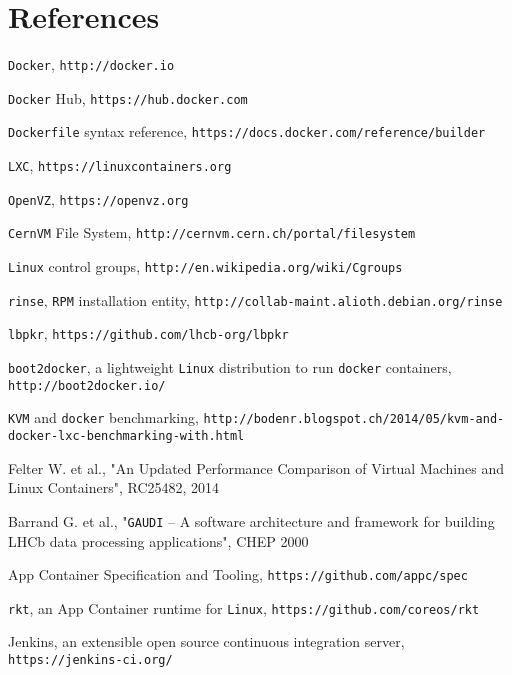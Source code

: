 \documentclass[a4paper]{jpconf}
\begin{document}
\section*{References}
\begin{thebibliography}{9}

	 \texttt{Docker},
		\verb'http://docker.io'

	 \texttt{Docker} Hub,
		\verb'https://hub.docker.com'

	 \texttt{Dockerfile} syntax reference,
		\verb'https://docs.docker.com/reference/builder'

	 \texttt{LXC},
		\verb'https://linuxcontainers.org'

	 \texttt{OpenVZ},
		\verb'https://openvz.org'

	 \texttt{CernVM} File System,
		\verb'http://cernvm.cern.ch/portal/filesystem'

	 \texttt{Linux} control groups,
		\verb'http://en.wikipedia.org/wiki/Cgroups'

	 \texttt{rinse}, \texttt{RPM} installation entity,
		\verb'http://collab-maint.alioth.debian.org/rinse'

	 \texttt{lbpkr},
		\verb'https://github.com/lhcb-org/lbpkr'

	 \texttt{boot2docker}, a lightweight \texttt{Linux}
		distribution to run \texttt{docker} containers,
		\verb'http://boot2docker.io/'

	 \texttt{KVM} and \texttt{docker} benchmarking,
		\verb'http://bodenr.blogspot.ch/2014/05/kvm-and-docker-lxc-benchmarking-with.html'

	 Felter W. et al., "An Updated Performance Comparison of Virtual Machines
		and Linux Containers", RC25482, 2014

	 Barrand G. et al., "\texttt{GAUDI} -- A software architecture and
		framework for building LHCb data processing applications",
		CHEP 2000

	 App Container Specification and Tooling,
		\verb'https://github.com/appc/spec'

	 \texttt{rkt}, an App Container runtime for \texttt{Linux},
		\verb'https://github.com/coreos/rkt'

	 Jenkins, an extensible open source continuous
		integration server,
		\verb'https://jenkins-ci.org/'


\end{thebibliography}
\end{document}
